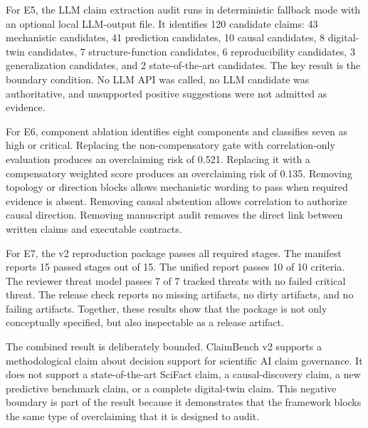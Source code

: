 For E5, the LLM claim extraction audit runs in deterministic fallback mode with an optional local LLM-output file. It identifies 120 candidate claims: 43 mechanistic candidates, 41 prediction candidates, 10 causal candidates, 8 digital-twin candidates, 7 structure-function candidates, 6 reproducibility candidates, 3 generalization candidates, and 2 state-of-the-art candidates. The key result is the boundary condition. No LLM API was called, no LLM candidate was authoritative, and unsupported positive suggestions were not admitted as evidence.

For E6, component ablation identifies eight components and classifies seven as high or critical. Replacing the non-compensatory gate with correlation-only evaluation produces an overclaiming risk of 0.521. Replacing it with a compensatory weighted score produces an overclaiming risk of 0.135. Removing topology or direction blocks allows mechanistic wording to pass when required evidence is absent. Removing causal abstention allows correlation to authorize causal direction. Removing manuscript audit removes the direct link between written claims and executable contracts.



For E7, the v2 reproduction package passes all required stages. The manifest reports 15 passed stages out of 15. The unified report passes 10 of 10 criteria. The reviewer threat model passes 7 of 7 tracked threats with no failed critical threat. The release check reports no missing artifacts, no dirty artifacts, and no failing artifacts. Together, these results show that the package is not only conceptually specified, but also inspectable as a release artifact.

The combined result is deliberately bounded. ClaimBench v2 supports a methodological claim about decision support for scientific AI claim governance. It does not support a state-of-the-art SciFact claim, a causal-discovery claim, a new predictive benchmark claim, or a complete digital-twin claim. This negative boundary is part of the result because it demonstrates that the framework blocks the same type of overclaiming that it is designed to audit.

